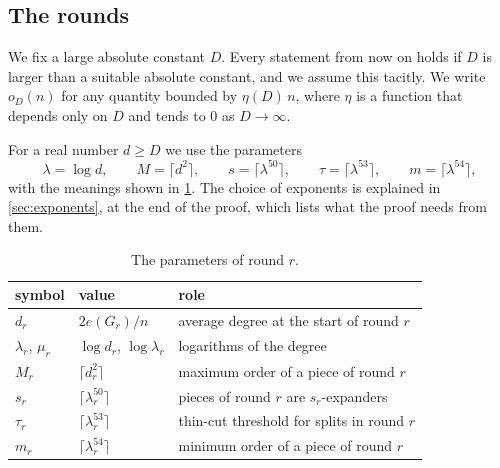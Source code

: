 \documentclass[11pt]{article}
\theoremstyle{definition}
\theoremstyle{remark}
\numberwithin{equation}{section}
\numberwithin{figure}{section}
\numberwithin{table}{section}
\newcommand{\oD}{o_D(n)}
\begin{document}
\subsection{The rounds}\label{sec:rounds}

We fix a large absolute constant $D$. Every statement from now on holds if $D$
is larger than a suitable absolute constant, and we assume this tacitly. We
write $\oD$ for any quantity bounded by $\eta(D)\,n$, where $\eta$ is a function
that depends only on $D$ and tends to $0$ as $D\to\infty$.

For a real number $d\ge D$ we use the parameters
\[
\lambda=\log d,\qquad M=\lceil d^2\rceil,\qquad s=\lceil\lambda^{50}\rceil,
\qquad \tau=\lceil\lambda^{53}\rceil,\qquad m=\lceil\lambda^{54}\rceil,
\]
with the meanings shown in \cref{tab:params}. The choice of exponents is
explained in \cref{sec:exponents}, at the end of the proof, which lists what
the proof needs from them.

\begin{table}[h]
\centering\small
\begin{tabular}{@{}lll@{}}
\toprule
symbol & value & role\\
\midrule
$d_r$ & $2e(G_r)/n$ & average degree at the start of round $r$\\
$\lambda_r$, $\mu_r$ & $\log d_r$, $\log\lambda_r$ & logarithms of the degree\\
$M_r$ & $\lceil d_r^2\rceil$ & maximum order of a piece of round $r$\\
$s_r$ & $\lceil\lambda_r^{50}\rceil$ & pieces of round $r$ are $s_r$-expanders\\
$\tau_r$ & $\lceil\lambda_r^{53}\rceil$ & thin-cut threshold for splits in round $r$\\
$m_r$ & $\lceil\lambda_r^{54}\rceil$ & minimum order of a piece of round $r$\\
\bottomrule
\end{tabular}
\caption{The parameters of round $r$.}
\label{tab:params}
\end{table}
\end{document}
